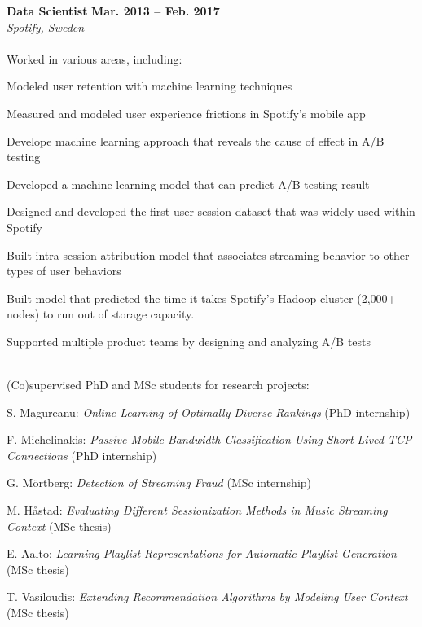 \documentclass[margin,line]{resume}
\begin{document}
\begin{resume}
\textbf{Data Scientist} \hfill \textbf{Mar. 2013 -- Feb. 2017} \vspace{0.75mm} \\%
\textsl{Spotify, Sweden} \vspace{1.5mm} \\
\vspace{-4.5mm}\\
Worked in various areas, including:
\begin{list2}
    \item Modeled user retention with machine learning techniques
    \item Measured and modeled user experience frictions in Spotify's mobile app
    \item Develope machine learning approach that reveals the cause of effect
        in A/B testing
    \item Developed a machine learning model that can predict A/B testing result
    \item Designed and developed the first user session dataset that was widely used
        within Spotify
    \item Built intra-session attribution model that associates streaming behavior
    to other types of user behaviors
    \item Built model that predicted the time it takes Spotify's Hadoop
    cluster (2,000+ nodes) to run out of storage capacity.
    \item Supported multiple product teams by designing and analyzing A/B tests
\end{list2}

\vspace{-2.5mm}\\

(Co)supervised PhD and MSc students for research projects:
\begin{list2}
    \item S. Magureanu: \emph{Online Learning of Optimally Diverse Rankings} (PhD internship)
    \item F. Michelinakis: \emph{Passive Mobile Bandwidth
    Classification Using Short Lived TCP Connections} (PhD internship)
    \item G. M{\"o}rtberg: \emph{Detection of Streaming Fraud} (MSc internship)
    \item M. H{\aa}stad: \emph{Evaluating Different Sessionization Methods in
    Music Streaming Context} (MSc thesis)
    \item E. Aalto: \emph{Learning Playlist Representations for Automatic Playlist
    Generation} (MSc thesis)
    \item T. Vasiloudis: \emph{Extending Recommendation Algorithms by Modeling
    User Context} (MSc thesis)
\end{list2}


\end{resume}
\end{document}
